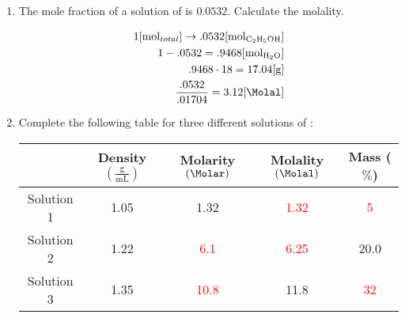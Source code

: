 \documentclass[12pt]{article}
\begin{document}
\begin{enumerate}
  \item The mole fraction of a solution of  is $0.0532$. Calculate the molality.

    \begin{equation}
      \begin{split}
        1[\si{\mole}_{total}]\rightarrow.0532[\si{\mole}_{\ce{C2H5OH}}]\\
        1-.0532=.9468[\si{\mole}_{\ce{H2O}}]\\
        .9468\cdot18=17.04[\si{\gram}]\\
        \frac{.0532}{.01704}=3.12[\si{\Molal}]
      \end{split}
      \label{4}
    \end{equation}

  \item Complete the following table for three different solutions of :

    \begin{center}
    \begin{tabular}[H]{|c|c|c|c|c|}
      \hline
      & Density $\left( \frac{\si{\gram}}{\si{\milli\liter}} \right)$ & Molarity $\left( \si{\Molar} \right)$ & Molality $\left( \si{\Molal} \right)$ & Mass ($\%$) \\
      \hline
      Solution 1 & 1.05 & 1.32 & \textcolor{red}{1.32} & \textcolor{red}{5} \\
      \hline
      Solution 2 & 1.22 & \textcolor{red}{6.1} & \textcolor{red}{6.25} & 20.0\\
      \hline
      Solution 3 & 1.35 & \textcolor{red}{10.8} & 11.8 & \textcolor{red}{32} \\
      \hline
    \end{tabular}
    \end{center}


\end{enumerate}
\end{document}
